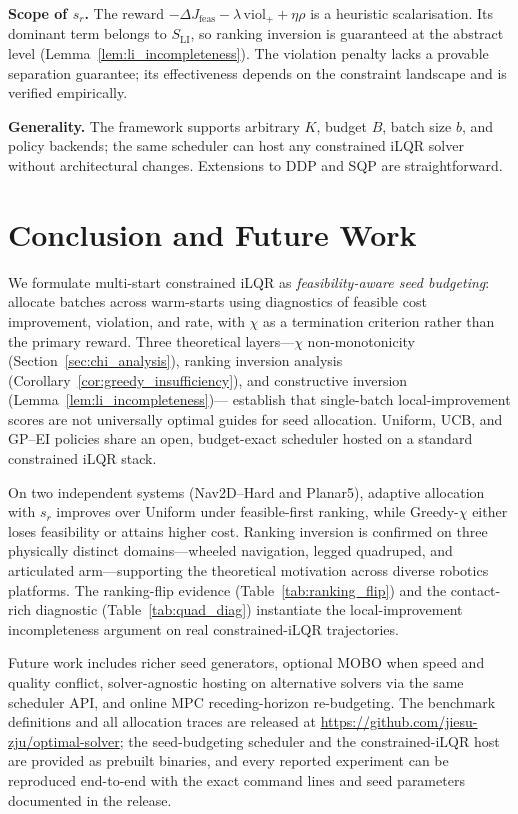 \documentclass[lettersize,journal]{IEEEtran}
\begin{document}
\textbf{Scope of $s_r$.}
The reward $-\Delta J_{\mathrm{feas}} - \lambda\,\mathrm{viol}_+ + \eta\rho$
is a heuristic scalarisation.  Its dominant term belongs to $S_{\mathrm{LI}}$,
so ranking inversion is guaranteed at the abstract level
(Lemma~\ref{lem:li_incompleteness}).  The violation penalty lacks a
provable separation guarantee; its effectiveness depends on the constraint
landscape and is verified empirically.

\textbf{Generality.}
The framework supports arbitrary $K$, budget $B$, batch size $b$, and policy
backends; the same scheduler can host any constrained iLQR solver without
architectural changes.  Extensions to DDP and SQP are straightforward.

\section{Conclusion and Future Work}
We formulate multi-start constrained iLQR as \emph{feasibility-aware seed
budgeting}: allocate batches across warm-starts using diagnostics of feasible
cost improvement, violation, and rate, with $\chi$ as a termination criterion
rather than the primary reward.
Three theoretical layers---$\chi$ non-monotonicity (Section~\ref{sec:chi_analysis}),
ranking inversion analysis (Corollary~\ref{cor:greedy_insufficiency}),
and constructive inversion (Lemma~\ref{lem:li_incompleteness})---
establish that single-batch local-improvement scores are not universally
optimal guides for seed allocation.  Uniform, UCB, and GP--EI policies
share an open, budget-exact scheduler hosted on a standard constrained
iLQR stack.

On two independent systems (Nav2D--Hard and Planar5), adaptive allocation
with $s_r$ improves over Uniform under feasible-first ranking, while
Greedy-$\chi$ either loses feasibility or attains higher cost.  Ranking
inversion is confirmed on three physically distinct domains---wheeled
navigation, legged quadruped, and articulated arm---supporting the
theoretical motivation across diverse robotics platforms.
The ranking-flip evidence (Table~\ref{tab:ranking_flip}) and the
contact-rich diagnostic (Table~\ref{tab:quad_diag}) instantiate the
local-improvement incompleteness argument on real constrained-iLQR
trajectories.

Future work includes richer seed generators, optional MOBO when speed and
quality conflict, solver-agnostic hosting on alternative
solvers via the same scheduler API, and online MPC receding-horizon
re-budgeting.  The benchmark definitions and all allocation traces are
released at
\url{https://github.com/jiesu-zju/optimal-solver}; the seed-budgeting
scheduler and the constrained-iLQR host are provided as prebuilt
binaries, and every reported experiment can be reproduced end-to-end with
the exact command lines and seed parameters documented in the release.
\end{document}
